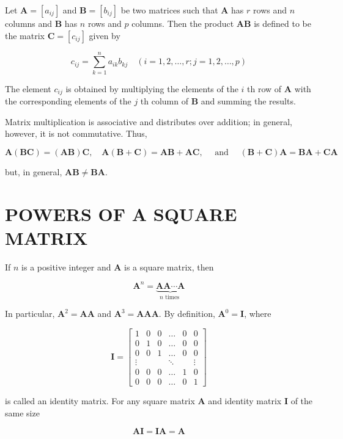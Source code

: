 \documentclass[10pt]{article}
\begin{document}
Let $\mathbf{A}=\left[a_{i j}\right]$ and $\mathbf{B}=\left[b_{i j}\right]$ be two matrices such that $\mathbf{A}$ has $r$ rows and $n$ columns and $\mathbf{B}$ has $n$ rows and $p$ columns. Then the product $\mathbf{A B}$ is defined to be the matrix $\mathbf{C}=\left[c_{i j}\right]$ given by

$$
c_{i j}=\sum_{k=1}^{n} a_{i k} b_{k j} \quad(i=1,2, \ldots, r ; j=1,2, \ldots, p)
$$

The element $c_{i j}$ is obtained by multiplying the elements of the $i$ th row of $\mathbf{A}$ with the corresponding elements of the $j$ th column of $\mathbf{B}$ and summing the results.

Matrix multiplication is associative and distributes over addition; in general, however, it is not commutative. Thus,

$$
\mathbf{A}(\mathbf{B C})=(\mathbf{A B}) \mathbf{C}, \quad \mathbf{A}(\mathbf{B}+\mathbf{C})=\mathbf{A B}+\mathbf{A C}, \quad \text { and } \quad(\mathbf{B}+\mathbf{C}) \mathbf{A}=\mathbf{B A}+\mathbf{C A}
$$

but, in general, $\mathbf{A B} \neq \mathbf{B A}$.

\section*{POWERS OF A SQUARE MATRIX}
If $n$ is a positive integer and $\mathbf{A}$ is a square matrix, then

$$
\mathbf{A}^{n}=\underbrace{\mathbf{A} \mathbf{A} \cdots \mathbf{A}}_{n \text { times }}
$$

In particular, $\mathbf{A}^{2}=\mathbf{A A}$ and $\mathbf{A}^{3}=\mathbf{A A A}$. By definition, $\mathbf{A}^{0}=\mathbf{I}$, where

$$
\mathbf{I}=\left[\begin{array}{cccccc}
1 & 0 & 0 & \ldots & 0 & 0 \\
0 & 1 & 0 & \ldots & 0 & 0 \\
0 & 0 & 1 & \ldots & 0 & 0 \\
\vdots & & & \ddots & & \vdots \\
0 & 0 & 0 & \ldots & 1 & 0 \\
0 & 0 & 0 & \ldots & 0 & 1
\end{array}\right]
$$

is called an identity matrix. For any square matrix $\mathbf{A}$ and identity matrix $\mathbf{I}$ of the same size

$$
\mathbf{A I}=\mathbf{I A}=\mathbf{A}
$$
\end{document}
